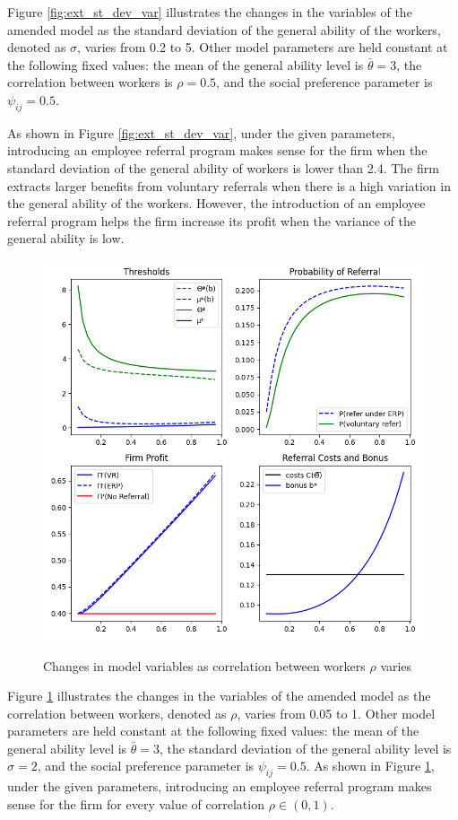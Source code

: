 \documentclass[12pt]{article}
\begin{document}
Figure \ref{fig:ext_st_dev_var} illustrates the changes in the  variables of the amended model as the standard deviation of the general ability of the workers, denoted as $\sigma$, varies from 0.2 to 5. Other model parameters are held constant at the following fixed values: the mean of the general ability level is $\bar{\theta} = 3$, the correlation between workers is $\rho = 0.5$, and the social preference parameter is $\psi_{ij} = 0.5$.

As shown in Figure \ref{fig:ext_st_dev_var}, under the given parameters, introducing an employee referral program makes sense for the firm when the standard deviation of the general  ability of workers is lower than 2.4. The firm extracts larger benefits from voluntary referrals when there is a high variation in the general ability of the workers. However, the introduction of an employee referral program helps the firm increase its profit when the variance of the general ability is low.

\begin{figure}[ht]
    \caption{Changes in model variables as correlation between workers $\rho$ varies}
    \includegraphics[width=12cm]{images/perf_rho_var.png}
    \centering
    \label{fig:ext_rho_var}
\end{figure}

Figure \ref{fig:ext_rho_var} illustrates the changes in the  variables of the amended model as the correlation between workers, denoted as $\rho$, varies from 0.05 to 1. Other model parameters are held constant at the following fixed values: the mean of the general ability level is $\bar{\theta} = 3$, the standard deviation of the general ability level is $\sigma = 2$, and the social preference parameter is $\psi_{ij} = 0.5$. As shown in Figure \ref{fig:ext_rho_var}, under the given parameters, introducing an employee referral program makes sense for the firm for every value of correlation $\rho \in (0, 1)$.
\end{document}
